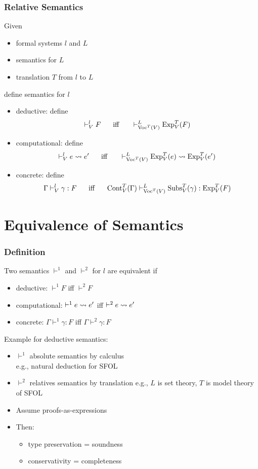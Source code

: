 \begin{frame}\frametitle{Relative Semantics}
Given
 \begin{itemize}
 \item formal systems $l$ and $L$
 \item semantics for $L$
 \item translation $T$ from $l$ to $L$
 \end{itemize}
define semantics for $l$
\medskip

\begin{itemize}
\item deductive: define
 \[\vdash^l_V F \hspace*{.5cm}\;\mathrm{iff}\;\hspace*{.5cm} \vdash^L_{\mathrm{Voc}^T(V)} \mathrm{Exp}^T_V(F) \]
\item computational: define
 \[\vdash^l_V e\rightsquigarrow e' \hspace*{.5cm}\;\mathrm{iff}\;\hspace*{.5cm} \vdash^L_{\mathrm{Voc}^T(V)}\mathrm{Exp}^T_V(e)\rightsquigarrow \mathrm{Exp}^T_V(e')\]
\item concrete: define
 \[\Gamma\vdash^l_V \gamma:F \hspace*{.5cm}\;\mathrm{iff}\;\hspace*{.5cm} \mathrm{Cont}^T_V(\Gamma)\vdash^L_{\mathrm{Voc}^T(V)}\mathrm{Subs}^T_V(\gamma):\mathrm{Exp}^T_V(F)\]
\end{itemize}
\end{frame}


\section{Equivalence of Semantics}

\begin{frame}\frametitle{Definition}
Two semantics $\vdash^1$ and $\vdash^2$ for $l$ are equivalent if
\begin{itemize}
\item deductive: $\vdash^1 F$ iff $\vdash^2 F$
\item computational: $\vdash^1 e\rightsquigarrow e'$ iff $\vdash^2 e\rightsquigarrow e'$
\item concrete: $\Gamma\vdash^1 \gamma:F$ iff $\Gamma\vdash^2 \gamma:F$
\end{itemize}

Example for deductive semantics:
\begin{itemize}
\item $\vdash^1$ absolute semantics by calculus \\
 e.g., natural deduction for SFOL
\item $\vdash^2$ relatives semantics by translation
 e.g., $L$ is set theory, $T$ is model theory of SFOL
\item Assume proofs-as-expressions
\item Then:
 \begin{itemize}
 \item type preservation = soundness
 \item conservativity = completeness
 \end{itemize}
\end{itemize}
\end{frame}

